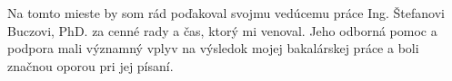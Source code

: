 Na tomto mieste by som rád poďakoval svojmu vedúcemu práce Ing. Štefanovi Buczovi, PhD. za cenné rady a čas, ktorý mi venoval. Jeho odborná pomoc a podpora mali významný vplyv na výsledok mojej bakalárskej práce a boli značnou oporou pri jej písaní.
